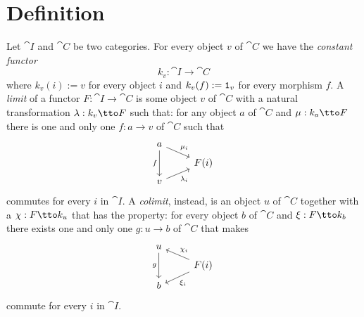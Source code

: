 
\section{Definition}


\begin{definition}\label{definition:LimitsAndColimits}
Let \(\cat I\) and \(\cat C\) be two categories. For every object \(v\) of \(\cat C\) we have the {\em constant functor}
\[k_v : \cat I \to \cat C\]
  where \(k_v(i) := v\) for every object \(i\) and \(k_v(f) := \mathtt 1_v\) for every morphism \(f\).  A {\em limit} of a functor \(F : \cat I \to \cat C\) is some object \(v\) of \(\cat C\) with a natural transformation \(\lambda : k_v \tto F\)
such that:
for any object \(a\) of \(\cat C\) and \(\mu : k_a \tto F\) there is one and only one \(f : a \to v\) of \(\cat C\) such that
\[\begin{tikzcd}[row sep=tiny]
a \ar["{\mu_i}", dr] \ar["f", dd, swap] \\
& F(i) \\
v \ar["{\lambda_i}", ur, swap]
\end{tikzcd}\]
commutes for every \(i\) in \(\cat I\).
A {\em colimit}, instead, is an object \(u\) of \(\cat C\) together with a \(\chi : F \tto k_u\) that has the property:
for every object \(b\) of \(\cat C\) and \(\xi : F \tto k_b\) there exists one and only one \(g : u \to b\) of \(\cat C\) that makes
\[\begin{tikzcd}[row sep=tiny]
u  \ar["g", dd, swap] \\
& F(i) \ar["{\chi_i}", ul, swap] \ar["{\xi_i}", dl]\\
b
\end{tikzcd}\]
commute for every \(i\) in \(\cat I\).
\end{definition}


